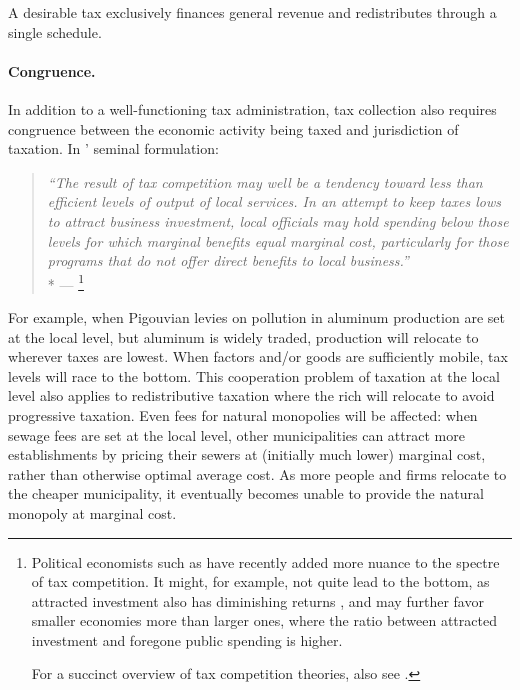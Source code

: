 \begin{desideratum}
	A desirable tax exclusively finances general revenue and redistributes through a single schedule.
	\label{des:redistribution-n-revenue-are-one}
\end{desideratum}

\paragraph[Congruence]{Congruence.}
In addition to a well-functioning tax administration, tax collection also requires congruence between the economic activity being taxed and jurisdiction of taxation.
In \citeauthor{Oates1972}' seminal formulation:

\begin{quote}
	\emph{``The result of tax competition may well be a tendency toward less than efficient levels of output of local services.
	In an attempt to keep taxes lows to attract business investment, local officials may hold spending below those levels for which marginal benefits equal marginal cost, particularly for those programs that do not offer direct benefits to local business.''}
	\\*
	--- \citet[143]{Oates1972}
	\footnote{
		Political economists such as \cite{Dehejia1999} have recently added more nuance to the spectre of tax competition.
		It might, for example, not quite lead to the bottom, as attracted investment also has diminishing returns \citeyearpar[416]{Dehejia1999}, and may further favor smaller economies more than larger ones, where the ratio between attracted investment and foregone public spending is higher.

		For a succinct overview of tax competition theories, also see \cite{Wilson1999}.
	}
\end{quote}

For example, when Pigouvian levies on pollution in aluminum production are set at the local level, but aluminum is widely traded, production will relocate to wherever taxes are lowest.
When factors and/or goods are sufficiently mobile, tax levels will race to the bottom.
This cooperation problem of taxation at the local level also applies to redistributive taxation where the rich will relocate to avoid progressive taxation.
Even fees for natural monopolies will be affected:
when sewage fees are set at the local level, other municipalities can attract more establishments by pricing their sewers at (initially much lower) marginal cost, rather than otherwise optimal average cost.
As more people and firms relocate to the cheaper municipality, it eventually becomes unable to provide the natural monopoly at marginal cost.

